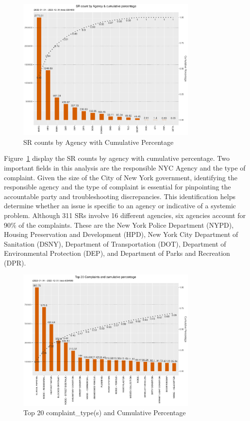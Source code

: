 \documentclass[12pt, titlepage]{article}
\begin{document}
\begin{figure}[tbp]
	\centering
	\includegraphics[width=0.8\textwidth]{SRs_by_Agency.pdf}
  	\caption{SR counts by Agency with Cumulative Percentage}
	\label{fig:SRcountbyAgency}
\end{figure}


Figure~\ref{fig:SRcountbyAgency} display the SR counts by agency with
cumulative percentage. Two important fields in this analysis are the
responsible NYC Agency and the type of complaint. Given the size of
the City of New York government, identifying the responsible agency
and the type of complaint is essential for pinpointing the accountable
party and troubleshooting discrepancies. This identification helps
determine whether an issue is specific to an agency or indicative of a
systemic problem. Although 311 SRs involve 16 different agencies, six
agencies account for 90\% of the complaints. These are the New York
Police Department (NYPD), Housing Preservation and Development (HPD),
New York City Department of Sanitation (DSNY), Department of
Transportation (DOT), Department of Environmental Protection (DEP),
and Department of Parks and Recreation (DPR).



\begin{figure}[tbp]
  \centering
  \includegraphics[width=0.8\textwidth]{SR_by_Complaint_Type.pdf} 
  \caption{Top 20 complaint\_type(s) and Cumulative Percentage} 
  \label{fig:SR_complaints}
\end{figure}
\end{document}
